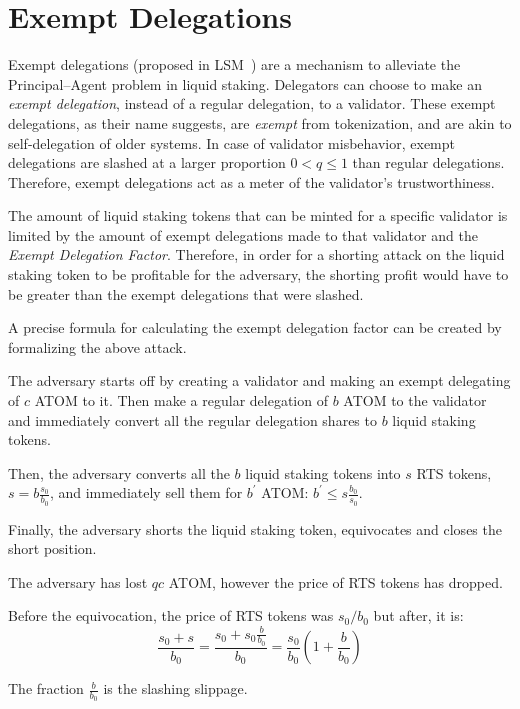 \section{Exempt Delegations}

Exempt delegations (proposed in LSM~\cite{liquidity-staking-module})
are a mechanism to alleviate
the Principal--Agent problem in liquid staking.
Delegators can choose to make an \emph{exempt delegation},
instead of a regular delegation, to a validator.
These exempt delegations, as their name suggests,
are \emph{exempt} from tokenization,
and are akin to self-delegation of older systems.
In case of validator misbehavior, exempt delegations
are slashed at a larger proportion $0 < q \leq 1$ than regular delegations.
Therefore, exempt delegations act as a meter of the
validator's trustworthiness.


The amount of liquid staking tokens that can be
minted for a specific validator is limited by the amount of
exempt delegations made to that validator and the \emph{Exempt Delegation Factor}.
Therefore, in order for a shorting attack on the liquid staking
token to be profitable for the adversary, the shorting profit would
have to be greater than the exempt delegations that were slashed.

A precise formula for calculating the exempt delegation factor can be
created by formalizing the above attack.


The adversary starts off by creating a validator and making an
exempt delegating of $c$ ATOM to it.
Then make a regular delegation of $b$ ATOM to the validator and
immediately convert all the regular delegation shares to $b$ liquid
staking tokens.

Then, the adversary converts all the $b$ liquid staking tokens into
$s$ RTS tokens, $s = b \frac{s_0}{b_0}$, and immediately sell them for
$b^{'}$ ATOM: $b^{'} \leq s \frac{b_0}{s_0}$.

Finally, the adversary shorts the liquid staking token, equivocates
and closes the short position.

The adversary has lost $qc$ ATOM, however the price of RTS
tokens has dropped.

Before the equivocation, the price of RTS tokens was $s_0/b_0$ but
after, it is:
\[
\frac{s_0 + s}{b_0} =
\frac{s_0 + s_0\frac{b}{b_0}}{b_0} =
\frac{s_0}{b_0} (1 + \frac{b}{b_0})
\]

The fraction $\frac{b}{b_0}$ is the slashing slippage.

